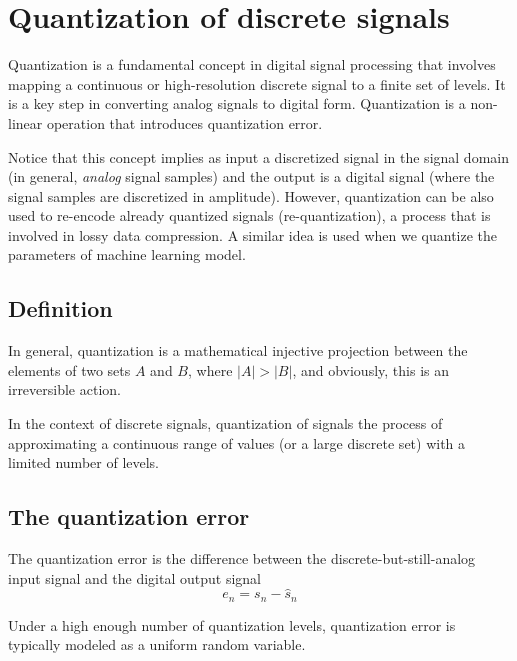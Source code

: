 \chapter{Quantization of discrete signals}

Quantization is a fundamental concept in digital signal processing
that involves mapping a continuous or high-resolution discrete signal
to a finite set of levels. It is a key step in converting analog
signals to digital form. Quantization is a non-linear operation that
introduces quantization error.

Notice that this concept implies as input a discretized signal in the
signal domain (in general, \emph{analog} signal samples) and the
output is a digital signal (where the signal samples are discretized
in amplitude). However, quantization can be also used to re-encode
already quantized signals (re-quantization), a process that is
involved in lossy data compression. A similar idea is used when we
quantize the parameters of machine learning model.

\section{Definition}
In general, quantization is a mathematical injective projection
between the elements of two sets $A$ and $B$, where $|A|>|B|$, and
obviously, this is an irreversible action.

In the context of discrete signals, quantization of signals the process
of approximating a continuous range of values (or a large discrete
set) with a limited number of levels.

\section{The quantization error}

The quantization error is the difference between the
discrete-but-still-analog input signal and the digital output signal
\begin{equation}
  e_n = s_n - \hat{s}_n
\end{equation}

Under a high enough number of quantization levels, quantization error
is typically modeled as a uniform random variable.

